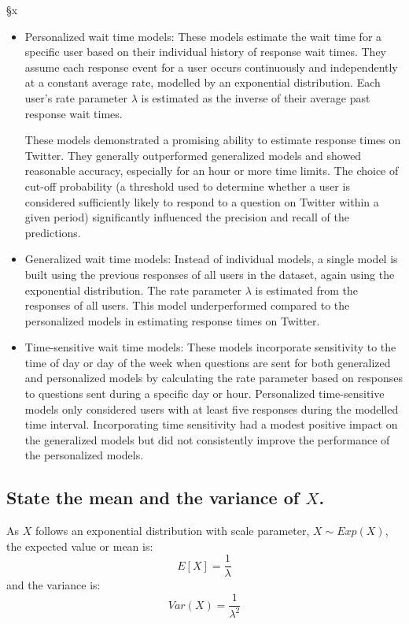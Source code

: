 §x\documentclass[]{article}
\begin{document}
\begin{itemize}
	\item Personalized wait time models: These models estimate the wait time for a specific user based on their individual history of response wait times. They assume each response event for a user occurs continuously and independently at a constant average rate, modelled by an exponential distribution. Each user's rate parameter $\lambda$ is estimated as the inverse of their average past response wait times.
	
	These models demonstrated a promising ability to estimate response times on Twitter. They generally outperformed generalized models and showed reasonable accuracy, especially for an hour or more time limits. The choice of cut-off probability (a threshold used to determine whether a user is considered sufficiently likely to respond to a question on Twitter within a given period) significantly influenced the precision and recall of the predictions.
	
	\item Generalized wait time models: Instead of individual models, a single model is built using the previous responses of all users in the dataset, again using the exponential distribution. The rate parameter $\lambda$ is estimated from the responses of all users. This model underperformed compared to the personalized models in estimating response times on Twitter.
	
	
	\item Time-sensitive wait time models: These models incorporate sensitivity to the time of day or day of the week when questions are sent for both generalized and personalized models by calculating the rate parameter based on responses to questions sent during a specific day or hour. Personalized time-sensitive models only considered users with at least five responses during the modelled time interval. Incorporating time sensitivity had a modest positive impact on the generalized models but did not consistently improve the performance of the personalized models.
\end{itemize}


\subsection{State the mean and the variance of $X$.}

As $X$ follows an exponential distribution with scale parameter, $X \sim Exp(X)$, the expected value or mean is:
\begin{equation}
	E[X] = \frac{1}{\lambda}
\end{equation}
and the variance is:
\begin{equation}
	Var(X) = \frac{1}{\lambda^2}
\end{equation}
\end{document}
